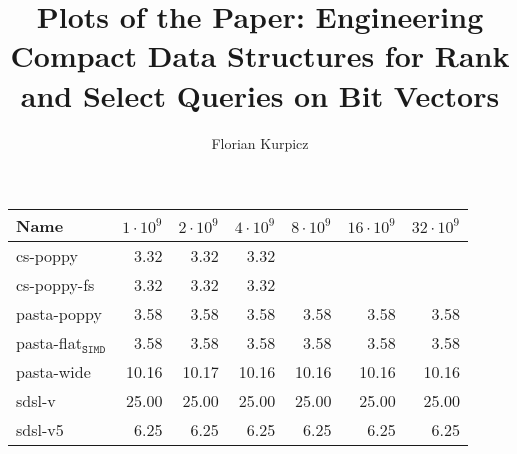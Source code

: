 \documentclass[a4paper,UKenglish,cleveref, autoref, thm-restate]{lipics-v2021}
\title{Plots of the Paper: Engineering Compact Data Structures for Rank and Select Queries on Bit Vectors} %
\author{Florian Kurpicz}{Karlsruhe Institute of Technology, Germany \and \url{https://kurpicz.org}}{kurpicz@kit.edu}{https://orcid.org/0000-0002-2379-9455}{}%
\begin{document}
\maketitle


\begin{table}
  \centering
  \begin{tabular}{lrrrrrr}
    \toprule
    Name & \(1\cdot 10^9\) & \(2\cdot 10^9\) & \(4\cdot 10^9\) & \(8\cdot 10^9\) & \(16\cdot 10^9\) & \(32\cdot 10^9\)\\
    \midrule
    cs-poppy &  3.32 &  3.32 &  3.32 &       &       &       \\
    cs-poppy-fs &  3.32 &  3.32 &  3.32 &       &       &       \\
    pasta-poppy &  3.58 &  3.58 &  3.58 &  3.58 &  3.58 &  3.58 \\
    pasta-flat\(_{\texttt{SIMD}}\)&  3.58 &  3.58 &  3.58 &  3.58 &  3.58 &  3.58 \\
    \midrule
    pasta-wide & 10.16 & 10.17 & 10.16 & 10.16 & 10.16 & 10.16 \\
    sdsl-v & 25.00 & 25.00 & 25.00 & 25.00 & 25.00 & 25.00 \\
    sdsl-v5 &  6.25 &  6.25 &  6.25 &  6.25 &  6.25 &  6.25 \\
    \midrule

\end{tabular}
\end{table}
\end{document}

